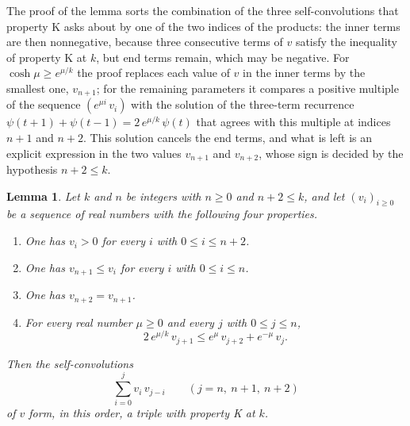 \documentclass{amsart}
\newtheorem{lemma}[theorem]{Lemma}
\theoremstyle{definition}
\theoremstyle{remark}
\numberwithin{equation}{section}
\begin{document}
The proof of the lemma sorts the combination of the three
self-convolutions that property K asks about by one of the two indices of
the products: the inner terms are then nonnegative,
because three consecutive terms of $v$ satisfy the inequality of property
K at $k$, but end terms remain, which may be negative. For
$\cosh\mu\ge e^{\mu/k}$ the proof replaces each value of $v$ in the inner
terms by the smallest one, $v_{n+1}$; for the remaining parameters it
compares a positive
multiple of the sequence $(e^{\mu i}\,v_i)$ with the solution of the
three-term recurrence $\psi(t+1)+\psi(t-1)=2\,e^{\mu/k}\,\psi(t)$ that
agrees with this multiple at indices $n+1$ and $n+2$. This solution
cancels the end terms,
and what is left is an explicit expression in the two values $v_{n+1}$ and
$v_{n+2}$, whose sign is decided by the hypothesis $n+2\le k$.

\begin{lemma}\label{lem:convolutionk}
Let $k$ and $n$ be integers with $n\ge0$ and $n+2\le k$, and let
$(v_i)_{i\ge0}$ be a sequence of real numbers with the following four
properties.
\begin{enumerate}
\item One has $v_i>0$ for every $i$ with $0\le i\le n+2$.
\item One has $v_{n+1}\le v_i$ for every $i$ with $0\le i\le n$.
\item One has $v_{n+2}=v_{n+1}$.
\item For every real number $\mu\ge0$ and every $j$ with $0\le j\le n$,
\[
2\,e^{\mu/k}\,v_{j+1}\le e^{\mu}\,v_{j+2}+e^{-\mu}\,v_j .
\]
\end{enumerate}
Then the self-convolutions
\[
\sum_{i=0}^{j}v_i\,v_{j-i}\qquad(j=n,\ n+1,\ n+2)
\]
of $v$ form, in this order, a triple with property K at $k$.
\end{lemma}
\end{document}
